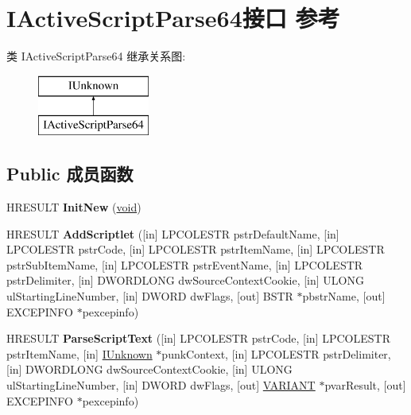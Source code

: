 \hypertarget{interface_i_active_script_parse64}{}\section{I\+Active\+Script\+Parse64接口 参考}
\label{interface_i_active_script_parse64}
类 I\+Active\+Script\+Parse64 继承关系图\+:\begin{figure}[H]
\begin{center}
\leavevmode
\includegraphics[height=2.000000cm]{interface_i_active_script_parse64}
\end{center}
\end{figure}
\subsection*{Public 成员函数}
\begin{DoxyCompactItemize}
\item 
\mbox{\label{interface_i_active_script_parse64_a78fd1a9eec606ae60f1d66c3210f84dd}} 
H\+R\+E\+S\+U\+LT {\bfseries Init\+New} (\hyperlink{interfacevoid}{void})
\item 
\mbox{\label{interface_i_active_script_parse64_ab023a3389a599197d303c264707ed18b}} 
H\+R\+E\+S\+U\+LT {\bfseries Add\+Scriptlet} (\mbox{[}in\mbox{]} L\+P\+C\+O\+L\+E\+S\+TR pstr\+Default\+Name, \mbox{[}in\mbox{]} L\+P\+C\+O\+L\+E\+S\+TR pstr\+Code, \mbox{[}in\mbox{]} L\+P\+C\+O\+L\+E\+S\+TR pstr\+Item\+Name, \mbox{[}in\mbox{]} L\+P\+C\+O\+L\+E\+S\+TR pstr\+Sub\+Item\+Name, \mbox{[}in\mbox{]} L\+P\+C\+O\+L\+E\+S\+TR pstr\+Event\+Name, \mbox{[}in\mbox{]} L\+P\+C\+O\+L\+E\+S\+TR pstr\+Delimiter, \mbox{[}in\mbox{]} D\+W\+O\+R\+D\+L\+O\+NG dw\+Source\+Context\+Cookie, \mbox{[}in\mbox{]} U\+L\+O\+NG ul\+Starting\+Line\+Number, \mbox{[}in\mbox{]} D\+W\+O\+RD dw\+Flags, \mbox{[}out\mbox{]} B\+S\+TR $\ast$pbstr\+Name, \mbox{[}out\mbox{]} E\+X\+C\+E\+P\+I\+N\+FO $\ast$pexcepinfo)
\item 
\mbox{\label{interface_i_active_script_parse64_af12df4c57251cdb41221a2e7d98fe6b7}} 
H\+R\+E\+S\+U\+LT {\bfseries Parse\+Script\+Text} (\mbox{[}in\mbox{]} L\+P\+C\+O\+L\+E\+S\+TR pstr\+Code, \mbox{[}in\mbox{]} L\+P\+C\+O\+L\+E\+S\+TR pstr\+Item\+Name, \mbox{[}in\mbox{]} \hyperlink{interface_i_unknown}{I\+Unknown} $\ast$punk\+Context, \mbox{[}in\mbox{]} L\+P\+C\+O\+L\+E\+S\+TR pstr\+Delimiter, \mbox{[}in\mbox{]} D\+W\+O\+R\+D\+L\+O\+NG dw\+Source\+Context\+Cookie, \mbox{[}in\mbox{]} U\+L\+O\+NG ul\+Starting\+Line\+Number, \mbox{[}in\mbox{]} D\+W\+O\+RD dw\+Flags, \mbox{[}out\mbox{]} \hyperlink{structtag_v_a_r_i_a_n_t}{V\+A\+R\+I\+A\+NT} $\ast$pvar\+Result, \mbox{[}out\mbox{]} E\+X\+C\+E\+P\+I\+N\+FO $\ast$pexcepinfo)
\end{DoxyCompactItemize}
